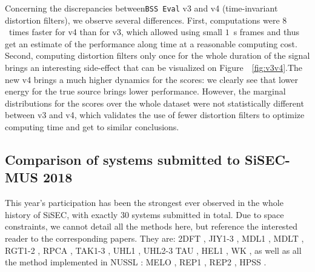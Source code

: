\documentclass{llncs}
\begin{document}
Concerning the discrepancies between\texttt{BSS~Eval} v3 and v4 (time-invariant distortion filters), we observe several differences. First, computations were $8$~times faster for v4 than for v3, which allowed using small $1$~s frames and thus get an estimate of the performance along time at a reasonable computing cost. Second, computing distortion filters only once for the whole duration of the signal brings an interesting side-effect that can be visualized on Figure~~\ref{fig:v3v4}.The new v4 brings a much higher dynamics for the scores: we clearly see that lower energy for the true source brings lower performance. However, the marginal distributions for the scores over the whole dataset were not statistically different between v3 and v4, which validates the use of fewer distortion filters to optimize computing time and get to similar conclusions.



\subsection{Comparison of systems submitted to SiSEC-MUS 2018}
This year's participation has been the strongest ever observed in the whole history of SiSEC, with exactly $30$ systems submitted in total. Due to space constraints, we cannot detail all the methods here, but reference the interested reader to the corresponding papers. They are: 2DFT \cite{2DFT}, JIY1-3 \cite{JY1}, MDL1 \cite{MDL1}, MDLT \cite{MDLT}, RGT1-2 \cite{RGT1}, RPCA \cite{RPCA}, TAK1-3 \cite{TAK1}, UHL1 \cite{UHL1}, UHL2-3 \cite{UHL2} TAU \cite{TAK1,UHL2}, HEL1 \cite{HEL1}, WK \cite{WK}, as well as all the method implemented in NUSSL \cite{NUSSL}: MELO \cite{MELO}, REP1 \cite{REP1}, REP2 \cite{REP2}, HPSS \cite{HPSS}.
\end{document}
